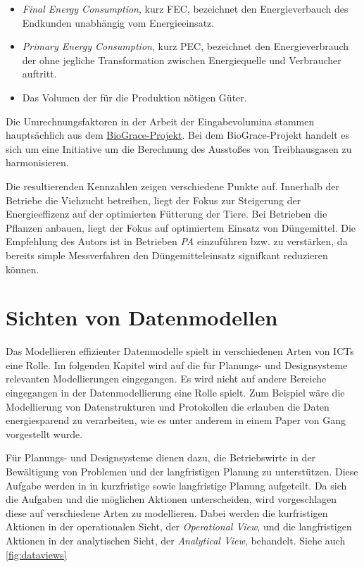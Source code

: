 \begin{itemize}
	\item \textit{Final Energy Consumption}, kurz FEC, bezeichnet den Energieverbauch des Endkunden unabhängig vom Energieeinsatz.
	\item \textit{Primary Energy Consumption}, kurz PEC, bezeichnet den Energieverbrauch der ohne jegliche Transformation zwischen Energiequelle und Verbraucher auftritt.
	\item Das Volumen der für die Produktion nötigen Güter.
\end{itemize}

Die Umrechnungsfaktoren in der Arbeit der Eingabevolumina stammen hauptsächlich aus dem \href{http://www.biograce.net/}{BioGrace-Projekt}.\cite{jour:Meyer-Aurich2013} Bei dem BioGrace-Projekt handelt es sich um eine Initiative um die Berechnung des Ausstoßes von Treibhausgasen zu harmonisieren.

Die resultierenden Kennzahlen zeigen verschiedene Punkte auf. Innerhalb der Betriebe die Viehzucht betreiben, liegt der Fokus zur Steigerung der Energieeffizenz auf der optimierten Fütterung der Tiere. Bei Betrieben die Pflanzen anbauen, liegt der Fokus auf optimiertem Einsatz von Düngemittel. Die Empfehlung des Autors ist in Betrieben \textit{PA} einzuführen bzw. zu verstärken, da bereits simple Messverfahren den Düngemitteleinsatz signifkant reduzieren können.\cite{jour:Meyer-Aurich2013}



\section{Sichten von Datenmodellen}
Das Modellieren effizienter Datenmodelle spielt in verschiedenen Arten von ICTs eine Rolle. Im folgenden Kapitel wird auf die für Planungs- und Designsysteme relevanten Modellierungen eingegangen. Es wird nicht auf andere Bereiche eingegangen in der Datenmodellierung eine Rolle spielt. Zum Beispiel wäre die Modellierung von Datenstrukturen und Protokollen die erlauben die Daten energiesparend zu verarbeiten, wie es unter anderem in einem Paper von Gang\cite{jour:Lu2007} vorgestellt wurde.

Für Planungs- und Designsysteme dienen dazu, die Betriebswirte in der Bewältigung von Problemen und der langfristigen Planung zu unterstützen. Diese Aufgabe werden in \cite{jour:Schulze2007} in kurzfristige sowie langfristige Planung aufgeteilt. Da sich die Aufgaben und die möglichen Aktionen unterscheiden, wird vorgeschlagen diese auf verschiedene Arten zu modellieren. Dabei werden die kurfristigen Aktionen in der operationalen Sicht, der \textit{Operational View}, und die langfristigen Aktionen in der analytischen Sicht, der \textit{Analytical View}, behandelt. Siehe auch \ref{fig:dataviews}

